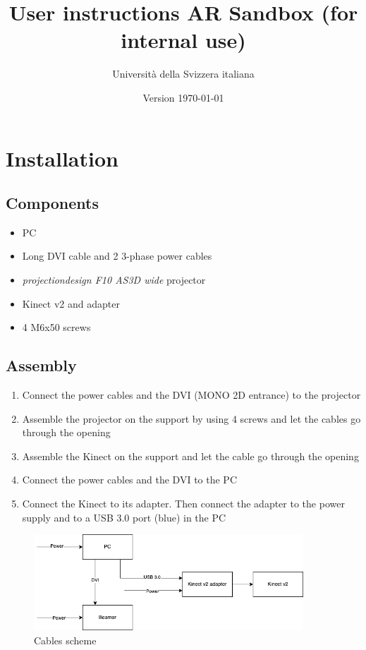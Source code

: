 \documentclass[12pt]{article}
\title{User instructions AR Sandbox (for internal use)}
\author{Università della Svizzera italiana}
\date{Version \today}
\begin{document}
\maketitle
\tableofcontents
\newpage


\section{Installation}\label{installation}

\subsection{Components}

\begin{itemize}
	\item PC
	\item Long DVI cable and 2 3-phase power cables
	\item \textit{projectiondesign F10 AS3D wide} projector
	\item Kinect v2 and adapter
	\item 4 M6x50 screws
\end{itemize}


\subsection{Assembly}

\begin{enumerate}
	\item Connect the power cables and the DVI (MONO 2D entrance) to the projector
	\item Assemble the projector on the support by using 4 screws and let the cables go through the opening
	\item Assemble the Kinect on the support and let the cable go through the opening
	\item Connect the power cables and the DVI to the PC
	\item Connect the Kinect to its adapter. Then connect the adapter to the power supply and to a USB 3.0 port (blue) in the PC
\end{enumerate}

\begin{figure}[H]
	\centering
	\includegraphics[width=0.9\textwidth]{img/cablesScheme.png}
	\caption*{Cables scheme}
\end{figure}
\end{document}
